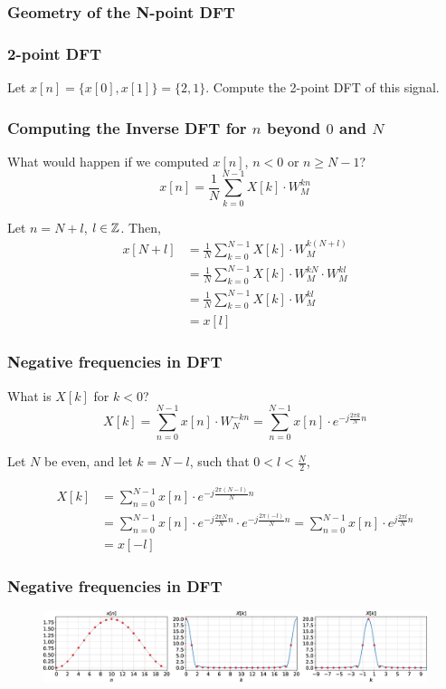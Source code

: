\documentclass[aspectratio=169]{beamer}
\def\mb{\ensuremath\mathbb}
\begin{document}
\begin{frame}[t]
  \frametitle{Geometry of the N-point DFT}
\end{frame}


\begin{frame}[t]
  \frametitle{2-point DFT}
  Let $x[n] = \{ x[0], x[1]\} = \{ 2, 1\}$. Compute the 2-point DFT of this signal.
\end{frame}


\begin{frame}[t]
  \frametitle{Computing the Inverse DFT for $n$ beyond $0$ and $N$}
  What would happen if we computed $x[n]$, $n < 0$ or $n \geq N-1$?
  \[  x[n] = \frac{1}{N}\sum_{k=0}^{N-1} X[k] \cdot W_M^{kn} \] 

  Let $n = N + l$, $l \in \mb{Z}$. Then,
  \[  \begin{split}
      x[N+l] &= \frac{1}{N}\sum_{k=0}^{N-1} X[k] \cdot W_M^{k(N + l)} \\
             &= \frac{1}{N}\sum_{k=0}^{N-1} X[k] \cdot W_M^{kN} \cdot W_M^{kl} \\
             &= \frac{1}{N}\sum_{k=0}^{N-1} X[k] \cdot W_M^{kl} \\
             &= x[l]
      \end{split}
  \]
\end{frame}


\begin{frame}[t]
  \frametitle{Negative frequencies in DFT}
  What is $X[k]$ for $k < 0$?
  \[ X[k] = \sum_{n=0}^{N-1} x[n] \cdot W_N^{-kn} = \sum_{n=0}^{N-1} x[n] \cdot e^{-j\frac{2\pi k}{N}n} \] 

  Let $N$ be even, and let $k = N - l$, such that $0 < l < \frac{N}{2}$,

  \[  \begin{split}
      X[k] &= \sum_{n=0}^{N-1} x[n] \cdot e^{-j\frac{2\pi (N - l)}{N}n} \\
           &= \sum_{n=0}^{N-1} x[n] \cdot e^{-j\frac{2\pi N}{N}n} \cdot e^{-j\frac{2\pi (-l)}{N} n} = \sum_{n=0}^{N-1} x[n] \cdot e^{j\frac{2\pi l}{N}n} \\
           &= x[-l]
      \end{split}
  \]
\end{frame}


\begin{frame}[t]
  \frametitle{Negative frequencies in DFT}
  \begin{figure}
  \centering
  \includegraphics[width=1\textwidth]{img/dftnegfreq.eps}
  \end{figure}
\end{frame}
\end{document}
